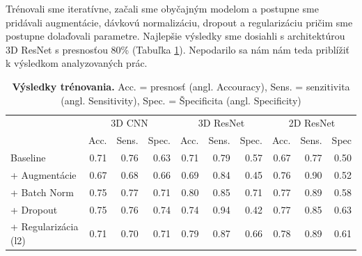 Trénovali sme iteratívne, začali sme obyčajným modelom a postupne sme pridávali augmentácie, dávkovú normalizáciu, dropout a regularizáciu pričim sme postupne dolaďovali parametre. Najlepšie výsledky sme dosiahli s architektúrou 3D ResNet s presnosťou 80\% (Tabuľka \ref{tab:model_training_results}). Nepodarilo sa nám nám teda priblížiť k výsledkom analyzovaných prác.

\begin{landscape}
    \begin{table}[]
        \centering
        \begin{tabular}{l|rrr|rrr|rrr|}
            \cline{2-10}
            \multirow{2}{*}{}    & \multicolumn{3}{c|}{3D CNN} & \multicolumn{3}{c|}{3D ResNet} & \multicolumn{3}{c|}{2D ResNet} \\ \cline{2-10} 
            &
            \multicolumn{1}{c|}{Acc.} &
            \multicolumn{1}{c|}{Sens.} &
            \multicolumn{1}{c|}{Spec.} &
            \multicolumn{1}{c|}{Acc.} &
            \multicolumn{1}{c|}{Sens.} &
            \multicolumn{1}{c|}{Spec.} &
            \multicolumn{1}{c|}{Acc.} &
            \multicolumn{1}{c|}{Sens.} &
            \multicolumn{1}{c|}{Spec} \\ \hline
            \multicolumn{1}{|l|}{Baseline}             & 0.71    & 0.76    & 0.63    & 0.71     & 0.79     & 0.57     & 0.67     & 0.77     & 0.50     \\
            \multicolumn{1}{|l|}{+ Augmentácie}        & 0.67    & 0.68    & 0.66    & 0.69     & 0.84     & 0.45     & 0.76     & 0.90     & 0.52     \\
            \multicolumn{1}{|l|}{+ Batch Norm}         & 0.75    & 0.77    & 0.71    & 0.80     & 0.85     & 0.71     & 0.77     & 0.89     & 0.58     \\
            \multicolumn{1}{|l|}{+ Dropout}            & 0.75    & 0.76    & 0.74    & 0.74     & 0.94     & 0.42     & 0.77     & 0.85     & 0.63     \\
            \multicolumn{1}{|l|}{+ Regularizácia (l2)} & 0.71    & 0.70    & 0.71    & 0.79     & 0.87     & 0.66     & 0.78     & 0.89     & 0.61    
        \end{tabular}
        \caption{\textbf{Výsledky trénovania.} Acc. = presnosť (angl. Accouracy), Sens. = senzitivita (angl. Sensitivity), Spec. = Špecificita (angl. Specificity)}
        \label{tab:model_training_results}
    \end{table}
\end{landscape}

